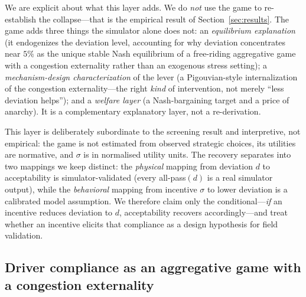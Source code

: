 \documentclass[12pt]{article}
\begin{document}
We are explicit about what this layer adds. We do \emph{not} use the game to re-establish the collapse---that is the empirical result of Section~\ref{sec:results}. The game adds three things the simulator alone does not: an \emph{equilibrium explanation} (it endogenizes the deviation level, accounting for why deviation concentrates near $5\%$ as the unique stable Nash equilibrium of a free-riding aggregative game with a congestion externality rather than an exogenous stress setting); a \emph{mechanism-design characterization} of the lever (a Pigouvian-style internalization of the congestion externality---the right \emph{kind} of intervention, not merely ``less deviation helps''); and a \emph{welfare layer} (a Nash-bargaining target and a price of anarchy). It is a complementary explanatory layer, not a re-derivation.

This layer is deliberately subordinate to the screening result and interpretive, not empirical: the game is not estimated from observed strategic choices, its utilities are normative, and $\sigma$ is in normalised utility units. The recovery separates into two mappings we keep distinct: the \emph{physical} mapping from deviation $d$ to acceptability is simulator-validated (every all-pass$(d)$ is a real simulator output), while the \emph{behavioral} mapping from incentive $\sigma$ to lower deviation is a calibrated model assumption. We therefore claim only the conditional---\emph{if} an incentive reduces deviation to $d$, acceptability recovers accordingly---and treat whether an incentive elicits that compliance as a design hypothesis for field validation.

\subsection{Driver compliance as an aggregative game with a congestion externality}
\end{document}
